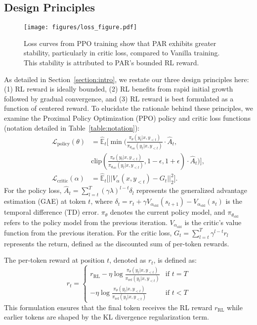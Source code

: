 \subsection{Design Principles} 

\begin{figure}[t]
    \centering
\texttt{[image: figures/loss\_figure.pdf]}
    \caption{Loss curves from PPO training show that PAR exhibits greater stability, particularly in critic loss, compared to Vanilla training. This stability is attributed to PAR's bounded RL reward.}
    \label{fig:ppo_loss_figure}
\end{figure}

As detailed in Section~\ref{section:intro}, we restate our three design principles here: (1) RL reward is ideally bounded, (2) RL benefits from rapid initial growth followed by gradual convergence, and (3) RL reward is best formulated as a function of centered reward. To elucidate the rationale behind these principles, we examine the Proximal Policy Optimization (PPO) policy and critic loss functions (notation detailed in Table~\ref{table:notation}):
\begin{align*}
    \mathcal{L}_\text{policy}(\theta) & = \hat{\mathbb{E}}_t \bigg[ \min \bigg(  \frac{\pi_\theta(y_{t}|x,y_{<t})}{\pi_{\theta_{\text{old}}}(y_{t}|x,y_{<t})} \cdot \hat{A}_t, \\
    & \text{clip} \left( \frac{\pi_\theta(y_{t}|x,y_{<t})}{\pi_{\theta_{\text{old}}}(y_{t}|x,y_{<t})}, 1 - \epsilon, 1 + \epsilon \right) \cdot \hat{A}_t \bigg) \bigg], \\
\mathcal{L}_\text{critic}(\alpha) &= \hat{\mathbb{E}}_t \big[ ||V_{\alpha}(x,y_{<t}) - G_t||_2^2 \big].
\end{align*}
For the policy loss, \( \hat{A}_t = \sum_{l=t}^{T} (\gamma\lambda)^{l-t} \delta_l \) represents the generalized advantage estimation (GAE) at token $t$, where \( \delta_t = r_t + \gamma V_{\alpha_{\text{old}}}(s_{t+1}) - V_{\alpha_{\text{old}}}(s_t) \) is the temporal difference (TD) error. \( \pi_\theta \) denotes the current policy model, and \( \pi_{\theta_{\text{old}}} \) refers to the policy model from the previous iteration.
$V_{\alpha_{\text{old}}}$ is the critic’s value function from the previous iteration. For the critic loss, \( G_t = \sum_{l=t}^T \gamma^{l-t} r_l \) represents the return, defined as the discounted sum of per-token rewards.

The per-token reward at position $t$, denoted as $r_t$, is defined as:
$$r_t=\begin{cases} 
       r_{\text{RL}}-\eta \log\frac{\pi_\theta(y_{t}|x,y_{<t})}{\pi_{\text{ref}}(y_{t}|x,y_{<t})} & \text{if } t = T\\
      -\eta \log\frac{\pi_\theta(y_{t}|x,y_{<t})}{\pi_{\text{ref}}(y_{t}|x,y_{<t})} & \text{if } t<T 
\end{cases}$$ This formulation ensures that the final token receives the RL reward $r_{\text{RL}}$ while earlier tokens are shaped by the KL divergence regularization term.

